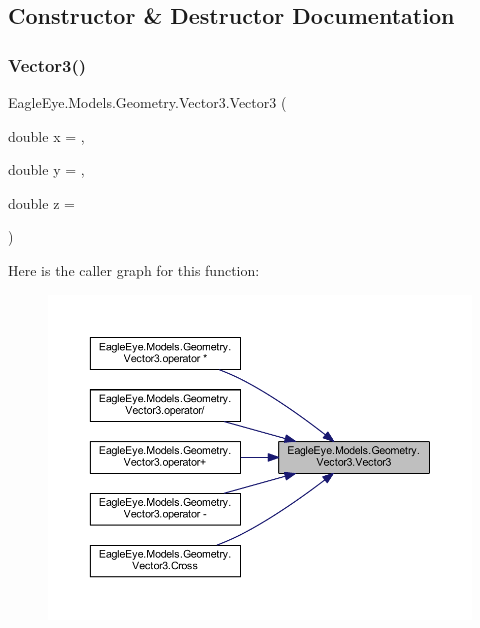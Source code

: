 \subsection{Constructor \& Destructor Documentation}
\mbox{\label{struct_eagle_eye_1_1_models_1_1_geometry_1_1_vector3_aff7ecbf36104d15e3faad8f411fa0a5a}} 
\subsubsection{\texorpdfstring{Vector3()}{Vector3()}}
{\footnotesize\ttfamily Eagle\+Eye.\+Models.\+Geometry.\+Vector3.\+Vector3 (\begin{DoxyParamCaption}\item[{double}]{x = {},  }\item[{double}]{y = {},  }\item[{double}]{z = {} }\end{DoxyParamCaption})}

Here is the caller graph for this function\+:\nopagebreak
\begin{figure}[H]
\begin{center}
\leavevmode
\includegraphics[width=350pt]{struct_eagle_eye_1_1_models_1_1_geometry_1_1_vector3_aff7ecbf36104d15e3faad8f411fa0a5a_icgraph}
\end{center}
\end{figure}


